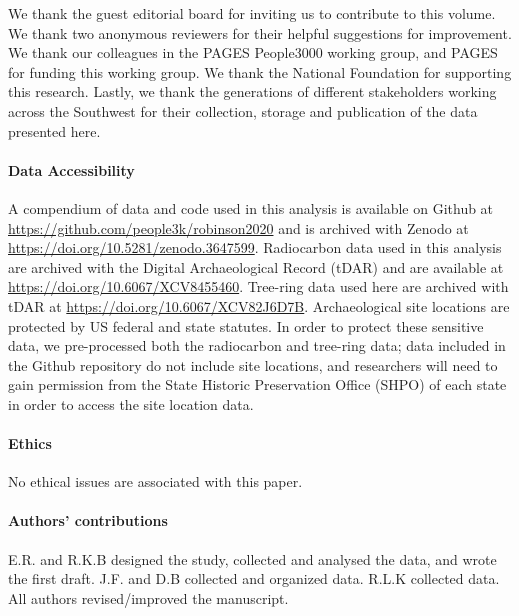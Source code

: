 \documentclass[
]{sa}
\begin{document}
We thank the guest editorial board for inviting us to contribute to this volume. We thank two anonymous reviewers for their helpful suggestions for improvement. We thank our colleagues in the PAGES People3000 working group, and PAGES for funding this working group. We thank the National Foundation for supporting this research. Lastly, we thank the generations of different stakeholders working across the Southwest for their collection, storage and publication of the data presented here.

\hypertarget{data-accessibility}{%
\paragraph*{Data Accessibility}\label{data-accessibility}}

A compendium of data and code used in this analysis is available on Github at \url{https://github.com/people3k/robinson2020} and is archived with Zenodo at \url{https://doi.org/10.5281/zenodo.3647599}. Radiocarbon data used in this analysis are archived with the Digital Archaeological Record (tDAR) and are available at \url{https://doi.org/10.6067/XCV8455460}. Tree-ring data used here are archived with tDAR at \url{https://doi.org/10.6067/XCV82J6D7B}. Archaeological site locations are protected by US federal and state statutes. In order to protect these sensitive data, we pre-processed both the radiocarbon and tree-ring data; data included in the Github repository do not include site locations, and researchers will need to gain permission from the State Historic Preservation Office (SHPO) of each state in order to access the site location data.

\hypertarget{ethics}{%
\paragraph*{Ethics}\label{ethics}}

No ethical issues are associated with this paper.

\hypertarget{authors-contributions}{%
\paragraph*{Authors' contributions}\label{authors-contributions}}

E.R. and R.K.B designed the study, collected and analysed the data, and wrote the first draft. J.F. and D.B collected and organized data. R.L.K collected data. All authors revised/improved the manuscript.
\end{document}
